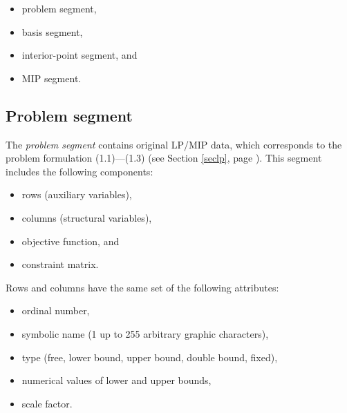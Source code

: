 \vspace*{-8pt}

\begin{itemize}\setlength{\itemsep}{0pt}
\item problem segment,

\item basis segment,

\item interior-point segment, and

\item MIP segment.
\end{itemize}

\subsection{Problem segment}

The {\it problem segment} contains original LP/MIP data, which
corresponds to the problem formulation (1.1)---(1.3) (see Section
\ref{seclp}, page \pageref{seclp}). This segment includes the following
components:

\vspace*{-8pt}

\begin{itemize}\setlength{\itemsep}{0pt}
\item rows (auxiliary variables),

\item columns (structural variables),

\item objective function, and

\item constraint matrix.
\end{itemize}

\vspace*{-7pt}

Rows and columns have the same set of the following attributes:

\vspace*{-7pt}

\begin{itemize}\setlength{\itemsep}{0pt}
\item ordinal number,

\item symbolic name (1 up to 255 arbitrary graphic characters),

\item type (free, lower bound, upper bound, double bound, fixed),

\item numerical values of lower and upper bounds,

\item scale factor.
\end{itemize}


